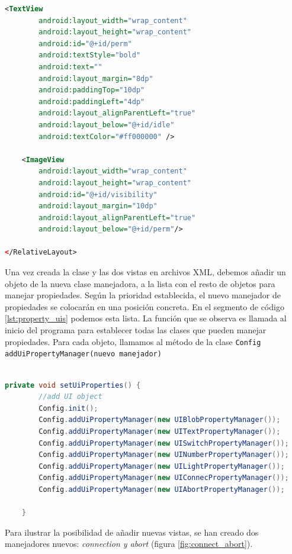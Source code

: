 \begin{lstlisting}[language=XML,caption={Vista XML en android},label={lst:xml_view}]
    <TextView
        android:layout_width="wrap_content"
        android:layout_height="wrap_content"
        android:id="@+id/perm"
        android:textStyle="bold"
        android:text=""
        android:layout_margin="8dp"
        android:paddingTop="10dp"
        android:paddingLeft="4dp"
        android:layout_alignParentLeft="true"
        android:layout_below="@+id/idle"
        android:textColor="#ff000000" />

    <ImageView
        android:layout_width="wrap_content"
        android:layout_height="wrap_content"
        android:id="@+id/visibility"
        android:layout_margin="10dp"
        android:layout_alignParentLeft="true"
        android:layout_below="@+id/perm"/>

</RelativeLayout>


\end{lstlisting}


\bigskip
Una vez creada la clase y las dos vistas en archivos XML, debemos añadir un objeto de la nueva clase manejadora, a la lista con el resto de objetos para manejar propiedades. Según la prioridad establecida, el nuevo manejador de propiedades se colocarán en una posición concreta. En el segmento de código \ref{lst:property_uis} podemos esta lista. La función que se observa es llamada al inicio del programa para establecer todas las clases que pueden manejar propiedades. Para cada objeto, llamamos al método de la clase \texttt{Config} \texttt{addUiPropertyManager(nuevo manejador)}

\begin{lstlisting}[language=Java,caption={Lista de objetos manejadores de propiedades},label={lst:property_uis}]

private void setUiProperties() {
        //add UI object
        Config.init();
        Config.addUiPropertyManager(new UIBlobPropertyManager());
        Config.addUiPropertyManager(new UITextPropertyManager());
        Config.addUiPropertyManager(new UISwitchPropertyManager());
        Config.addUiPropertyManager(new UINumberPropertyManager());
        Config.addUiPropertyManager(new UILightPropertyManager());
        Config.addUiPropertyManager(new UIConnecPropertyManager());
        Config.addUiPropertyManager(new UIAbortPropertyManager());

    }

\end{lstlisting}

\bigskip
Para ilustrar la posibilidad de añadir nuevas vistas, se han creado dos manejadores nuevos: \textit{connection y abort} (figura \ref{fig:connect_abort}).

